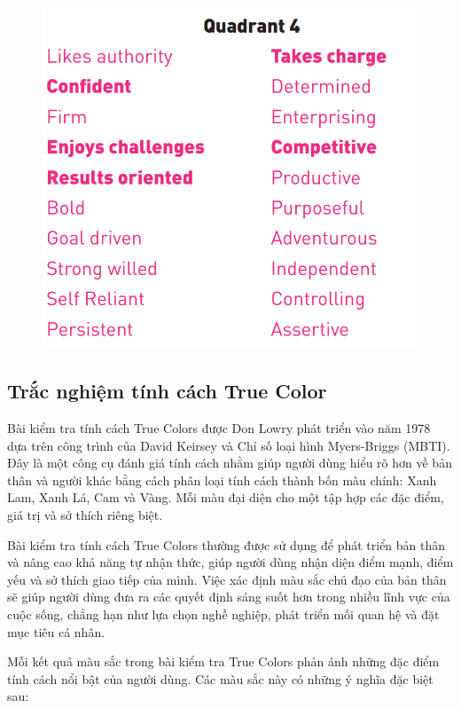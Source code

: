 \begin{figure}[H]
    \centering
    \includegraphics[width=0.9\linewidth, height=0.47\textheight]{images/chap3/ws4.png}
\end{figure}

\subsection{Trắc nghiệm tính cách True Color}

Bài kiểm tra tính cách True Colors được Don Lowry phát triển vào năm 1978 dựa trên công trình của David Keirsey và Chỉ số loại hình Myers-Briggs (MBTI). Đây là một công cụ đánh giá tính cách nhằm giúp người dùng hiểu rõ hơn về bản thân và người khác bằng cách phân loại tính cách thành bốn màu chính: Xanh Lam, Xanh Lá, Cam và Vàng. Mỗi màu đại diện cho một tập hợp các đặc điểm, giá trị và sở thích riêng biệt.

Bài kiểm tra tính cách True Colors thường được sử dụng để phát triển bản thân và nâng cao khả năng tự nhận thức, giúp người dùng nhận diện điểm mạnh, điểm yếu và sở thích giao tiếp của mình. Việc xác định màu sắc chủ đạo của bản thân sẽ giúp người dùng đưa ra các quyết định sáng suốt hơn trong nhiều lĩnh vực của cuộc sống, chẳng hạn như lựa chọn nghề nghiệp, phát triển mối quan hệ và đặt mục tiêu cá nhân.

Mỗi kết quả màu sắc trong bài kiểm tra True Colors phản ánh những đặc điểm tính cách nổi bật của người dùng. Các màu sắc này có những ý nghĩa đặc biệt sau:

